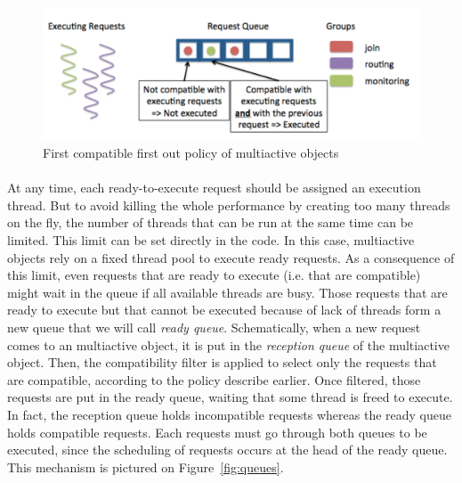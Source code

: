 \documentclass[11pt]{report}
\begin{document}
\begin{figure}[ht]
      \begin{minipage}[c]{\textwidth}
      \centering
      \includegraphics[scale=0.5]{pictures/multiactive_object.pdf}
      \end{minipage}
      \caption{First compatible first out policy of multiactive objects}
      \label{fig:multiactive_object}
\end{figure}

\paragraph{}
At any time, each ready-to-execute request should be assigned an execution thread. But to avoid killing the whole performance by creating too many threads on the fly, the number of threads that can be run at the same time can be limited. This limit can be set directly in the code. In this case, multiactive objects rely on a fixed thread pool to execute ready requests.  
As a consequence of this limit, even requests that are ready to execute (i.e. that are compatible) might wait in the queue if all available threads are busy. Those requests that are ready to execute but that cannot be executed because of lack of threads form a new queue that we will call \emph{ready queue}. 
Schematically, when a new request comes to an multiactive object, it is put in the \emph{reception queue} of the multiactive object. Then, the compatibility filter is applied to select only the requests that are compatible, according to the policy describe earlier. Once filtered, those requests are put in the ready queue, waiting that some thread is freed to execute. In fact, the reception queue holds incompatible requests whereas the ready queue holds compatible requests. Each requests must go through both queues to be executed, since the scheduling of requests occurs at the head of the ready queue. This mechanism is pictured on Figure~\ref{fig:queues}.
\end{document}
